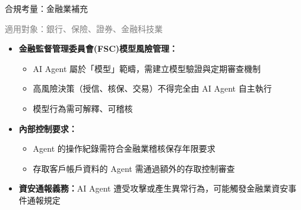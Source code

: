 \documentclass[aspectratio=1610]{Common/MyCourseBeamer}
\begin{document}
\begin{frame}{合規考量：金融業補充}

	{\scriptsize\textcolor{gray}{適用對象：銀行、保險、證券、金融科技業}}\vspace{0.3em}

	\begin{itemize}
		\item \textbf{金融監督管理委員會(FSC)模型風險管理：}
			\begin{itemize}
				\item AI Agent 屬於「模型」範疇，需建立模型驗證與定期審查機制
				\item 高風險決策（授信、核保、交易）不得完全由 AI Agent 自主執行
				\item 模型行為需可解釋、可稽核
			\end{itemize}

		\item \textbf{內部控制要求：}
			\begin{itemize}
				\item Agent 的操作紀錄需符合金融業稽核保存年限要求
				\item 存取客戶帳戶資料的 Agent 需通過額外的存取控制審查
			\end{itemize}

		\item \textbf{資安通報義務：}AI Agent 遭受攻擊或產生異常行為，可能觸發金融業資安事件通報規定
	\end{itemize}

\end{frame}
\end{document}
